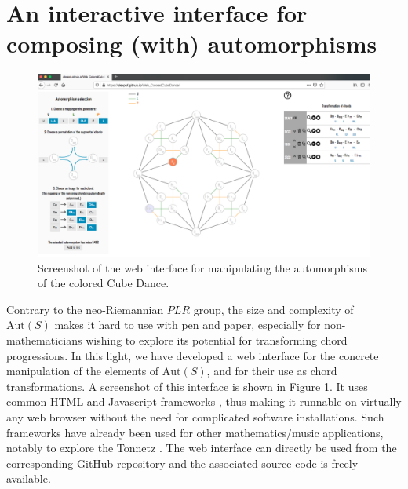 \documentclass[10pt]{amsart}
\begin{document}
\section{An interactive interface for composing (with) automorphisms}

\begin{figure}[b!]
	\begin{center}
	\includegraphics[scale=0.24]{web_interface.png}
	\end{center}
	\caption{Screenshot of the web interface for manipulating the automorphisms of the colored Cube Dance.}
	\label{fig:interface_screenshot}
\end{figure}

Contrary to the neo-Riemannian $PLR$ group, the size and complexity of $\text{Aut}(S)$ makes it hard to use with pen and paper, especially for non-mathematicians wishing to explore its potential for transforming chord progressions. In this light, we have developed a web interface for the concrete manipulation of the elements of $\text{Aut}(S)$, and for their use as chord transformations. A screenshot of this interface is shown in Figure \ref{fig:interface_screenshot}. It uses common HTML and Javascript frameworks \cite{D3JS}, thus making it runnable on virtually any web browser without the need for complicated software installations. Such frameworks have already been used for other mathematics/music applications, notably to explore the Tonnetz \cite{TonnetzGuichaoua}. The web interface can directly be used from the corresponding GitHub repository \cite{WebColorCubeDance} and the associated source code is freely available.
\end{document}
